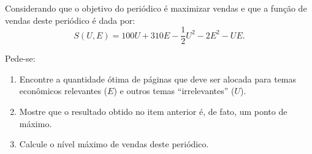 \documentclass[preprintnumbers,nofootinbib,amsmath,amssymb,12pt]{article}
\begin{document}
\begin{enumerate}
Considerando que o objetivo do periódico é maximizar vendas e que a função de vendas deste periódico é dada por:
\[
S(U,E) = 100U + 310E - \frac{1}{2}U^2 - 2E^2 - UE.
\]

Pede-se:
\begin{enumerate}
    \item Encontre a quantidade ótima de páginas que deve ser alocada para temas econômicos relevantes ($E$) e outros temas ``irrelevantes'' ($U$).
    \item Mostre que o resultado obtido no item anterior é, de fato, um ponto de máximo.
    \item Calcule o nível máximo de vendas deste periódico.
\end{enumerate}

    
    \end{enumerate}
\end{document}
